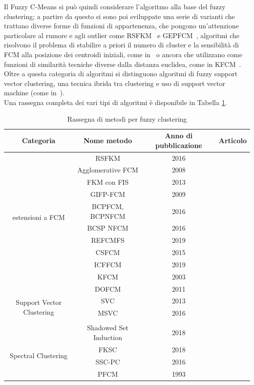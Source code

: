 \documentclass[oneside, openany]{book}
\begin{document}
		Il Fuzzy C-Means si può quindi considerare l'algoritmo alla base del fuzzy clustering; a partire da questo si sono poi sviluppate una serie di varianti che trattano diverse forme di funzioni di appartenenza, che pongono un'attenzione particolare al rumore e agli outlier come RSFKM~\cite{bib:rsfkm} e GEPFCM~\cite{bib:gifpfcm}, algoritmi che risolvono il problema di stabilire a priori il numero di cluster e la sensibilità di FCM alla posizione dei centroidi iniziali, come in~\cite{bib:afkm} o ancora che utilizzano come funzioni di similarità tecniche diverse dalla distanza euclidea, come in KFCM~\cite{bib:kfcm}.
		\\
		Oltre a questa categoria di algoritmi si distinguono algoritmi di fuzzy support vector clustering, una tecnica ibrida tra clustering e uso di support vector machine (come in~\cite{bib:svc,bib:msvc}).
		\\
		Una rassegna completa dei vari tipi di algoritmi è disponibile in Tabella \ref{tab:clustering}.
		\begin{table}[h!]
			\caption{Rassegna di metodi per fuzzy clustering}
			\begin{center}\begin{tabular}{ |c|c|c|c| } 
					\hline
					Categoria & Nome metodo & Anno di pubblicazione & Articolo\\
					\hline
					\multirow{10}{4em}{estensioni a FCM} 
					& RSFKM & 2016 & \cite{bib:rsfkm}\\ 
					& Agglomerative FCM & 2008 & \cite{bib:afkm}\\
					& FKM con FIS & 2013 & \cite{bib:fkmfis}\\ 
					& GIFP-FCM & 2009 & \cite{bib:gifpfcm}\\
					& BCPFCM, BCPNFCM & 2016 & \cite{bib:bcpfcm}\\
					& BCSP NFCM & 2016 & \cite{bib:bcpfcm}\\
					& REFCMFS & 2019 & \cite{bib:refcmfs}\\ 
					& CSFCM & 2015 & \cite{bib:csfcm}\\
					& ICFFCM & 2019 &\cite{bib:icffcm}\\
					& KFCM & 2003 &\cite{bib:kfcm}\\
					& DOFCM & 2011 & \cite{bib:dofcm}\\
					\hline													
					\multirow{2}{4em}{Support Vector Clustering}	& SVC & 2013 & \cite{bib:svc}\\ 
					& MSVC & 2016 & \cite{bib:msvc}\\ 
					&  &  & \\
					\hline
					& Shadowed Set Induction & 2018 & \cite{bib:ssi} \\
					\hline
					\multirow{2}{4em}{Spectral Clustering}	& FKSC & 2018 & \cite{bib:fksc}\\ 
					& SSC-PC & 2016 & \cite{bib:sscpc}\\ 
					\hline
					& PFCM & 1993 & \cite{bib:pfcm}\\
					\hline
				\end{tabular}
			\end{center}
			\label{tab:clustering}	
		\end{table}
	
\end{document}
